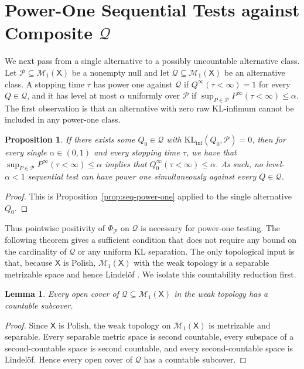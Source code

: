 \documentclass[11pt]{article}
\newcommand{\KLinf}{\mathrm{KL}_{\mathrm{inf}}}
\newcommand{\Pcal}{\mathcal{P}}
\newcommand{\Qcal}{\mathcal{Q}}
\newcommand{\X}{\mathsf{X}}
\newtheorem{proposition}[theorem]{Proposition}
\newtheorem{lemma}[theorem]{Lemma}
\theoremstyle{definition}
\theoremstyle{definition}
\begin{document}
\section{Power-One Sequential Tests against Composite \texorpdfstring{$\mathcal Q$}{Q}}\label{sec:composite}
We next pass from a single alternative to a possibly uncountable alternative class.  Let $\Pcal\subseteq\mathcal M_1(\X)$ be a nonempty null and let $\Qcal\subseteq\mathcal M_1(\X)$ be an alternative class.  A stopping time $\tau$ has power one against $\Qcal$ if $Q^\infty(\tau<\infty)=1$ for every $Q\in\Qcal$, and it has level at most $\alpha$ uniformly over $\Pcal$ if $\sup_{P\in\Pcal}P^\infty(\tau<\infty)\le\alpha$.  The first observation is that an alternative with zero raw KL-infimum cannot be included in any power-one class.

\begin{proposition}\label{prop:composite-necessary}
If there exists some $Q_0\in\Qcal$ with $\KLinf(Q_0, \Pcal)=0$, then for every single $\alpha\in(0,1)$ and every stopping time $\tau$, we have that $\sup_{P\in\Pcal}P^\infty(\tau<\infty)\le \alpha$ implies that $Q_0^\infty(\tau<\infty)\le \alpha$. As such, no level-$\alpha<1$ sequential test can have power one simultaneously against every $Q\in\Qcal$.   
\end{proposition}


\begin{proof}
This is Proposition~\ref{prop:seq-power-one} applied to the single alternative $Q_0$.
\end{proof}

Thus pointwise positivity of $\Phi_\Pcal$ on $\Qcal$ is necessary for power-one testing.  The following theorem gives a sufficient condition that does not require any bound on the cardinality of $\Qcal$ or any uniform KL separation.  The only topological input is that, because $\X$ is Polish, $\mathcal M_1(\X)$ with the weak topology is a separable metrizable space and hence Lindel{\"o}f \parencite{Good1995,steen1978counterexamples}.  We isolate this countability reduction first.

\begin{lemma}\label{lem:lindelof}
Every open cover of $\Qcal\subseteq\mathcal M_1(\X)$ in the weak topology has a countable subcover.    
\end{lemma}


\begin{proof}
Since $\X$ is Polish, the weak topology on $\mathcal M_1(\X)$ is metrizable and separable.  Every separable metric space is second countable, every subspace of a second-countable space is second countable, and every second-countable space is Lindel{\"o}f.  Hence every open cover of $\Qcal$ has a countable subcover.
\end{proof}
\end{document}
